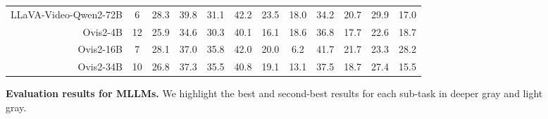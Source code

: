 \begin{figure}[ht!]
{\begin{tabular}{r|cc|ccccccccc}
LLaVA-Video-Qwen2-72B & 6 & 28.3 & 39.8 & 31.1 & 42.2 & 23.5 & 18.0 & 34.2 & 20.7 & 29.9 & 17.0 \\
Ovis2-4B & 12 & 25.9 & 34.6 & 30.3 & 40.1 & 16.1 & 18.6 & 36.8 & 17.7 & 22.6 & 18.7 \\
Ovis2-16B & 7 & 28.1 & 37.0 & \cellcolor{deeper-gray}35.8 & 42.0 & 20.0 & 6.2 & 41.7 & 21.7 & 23.3 & 28.2 \\
Ovis2-34B & 10 & 26.8 & 37.3 & \cellcolor{light-gray}35.5 & 40.8 & 19.1 & 13.1 & 37.5 & 18.7 & 27.4 & 15.5 \\
\hline
\end{tabular}
}
 \vspace{-0.3cm}
\caption{\textbf{Evaluation results for MLLMs.} We highlight the best and second-best results for each sub-task in \colorbox{deeper-gray}{deeper gray} and \colorbox{light-gray}{light gray}.}
\label{tab:main_table}
\vspace{-0.5cm}
\end{figure}